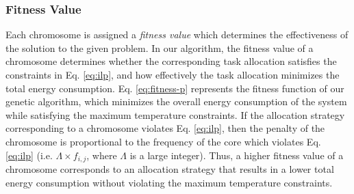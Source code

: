 \documentclass[conference]{IEEEtran}
\begin{document}
\subsubsection{Fitness Value} Each chromosome is assigned a \emph{fitness value} which determines the effectiveness of the solution
to the given problem. In our algorithm, the fitness value of a chromosome determines whether the corresponding task allocation 
satisfies the constraints  in Eq. \ref{eq:ilp}, and how effectively 
the task allocation minimizes the
total energy consumption.
%
%
%
%
Eq. \ref{eq:fitness-p} represents the fitness function of our genetic algorithm, which minimizes the 
overall energy consumption of the system while satisfying the maximum temperature constraints. 
If the allocation strategy corresponding to a chromosome violates Eq. \ref{eq:ilp}, then the penalty of the chromosome is
proportional to the frequency of the core 
which violates  Eq. \ref{eq:ilp} (i.e. $\Lambda \times f_{i,j}$, where
$\Lambda$ is a large integer).
Thus, a higher fitness value of a chromosome corresponds to an allocation strategy that results in
a lower total energy consumption without violating the maximum temperature constraints. 



\vspace{-0.2in}
\end{document}

